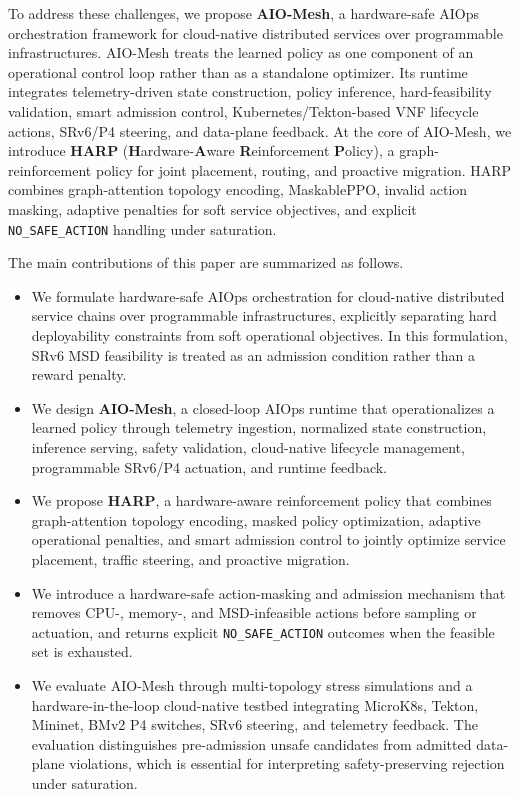 \documentclass[final,5p]{elsarticle}
\begin{document}
To address these challenges, we propose \textbf{AIO-Mesh}, a hardware-safe AIOps orchestration framework for cloud-native distributed services over programmable infrastructures. AIO-Mesh treats the learned policy as one component of an operational control loop rather than as a standalone optimizer. Its runtime integrates telemetry-driven state construction, policy inference, hard-feasibility validation, smart admission control, Kubernetes/Tekton-based VNF lifecycle actions, SRv6/P4 steering, and data-plane feedback. At the core of AIO-Mesh, we introduce \textbf{HARP} (\textbf{H}ardware-\textbf{A}ware \textbf{R}einforcement \textbf{P}olicy), a graph-reinforcement policy for joint placement, routing, and proactive migration. HARP combines graph-attention topology encoding, MaskablePPO, invalid action masking, adaptive penalties for soft service objectives, and explicit \texttt{NO\_SAFE\_ACTION} handling under saturation.

The main contributions of this paper are summarized as follows.

\begin{itemize}
    \item We formulate hardware-safe AIOps orchestration for cloud-native distributed service chains over programmable infrastructures, explicitly separating hard deployability constraints from soft operational objectives. In this formulation, SRv6 MSD feasibility is treated as an admission condition rather than a reward penalty.
    
    \item We design \textbf{AIO-Mesh}, a closed-loop AIOps runtime that operationalizes a learned policy through telemetry ingestion, normalized state construction, inference serving, safety validation, cloud-native lifecycle management, programmable SRv6/P4 actuation, and runtime feedback.
    
    \item We propose \textbf{HARP}, a hardware-aware reinforcement policy that combines graph-attention topology encoding, masked policy optimization, adaptive operational penalties, and smart admission control to jointly optimize service placement, traffic steering, and proactive migration.
    
    \item We introduce a hardware-safe action-masking and admission mechanism that removes CPU-, memory-, and MSD-infeasible actions before sampling or actuation, and returns explicit \texttt{NO\_SAFE\_ACTION} outcomes when the feasible set is exhausted.
    
    \item We evaluate AIO-Mesh through multi-topology stress simulations and a hardware-in-the-loop cloud-native testbed integrating MicroK8s, Tekton, Mininet, BMv2 P4 switches, SRv6 steering, and telemetry feedback. The evaluation distinguishes pre-admission unsafe candidates from admitted data-plane violations, which is essential for interpreting safety-preserving rejection under saturation.
\end{itemize}
\end{document}
